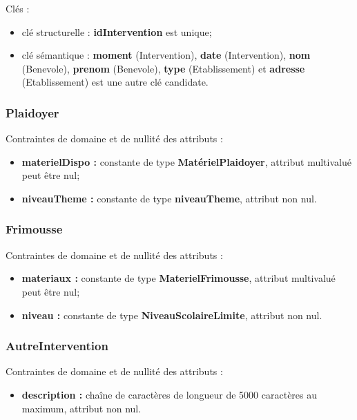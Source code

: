 Clés : 
\begin{itemize}
\item clé structurelle : \textbf{idIntervention} est unique;
\item clé sémantique : \textbf{moment} (Intervention), \textbf{date} (Intervention), \textbf{nom} (Benevole), \textbf{prenom} (Benevole), \textbf{type} (Etablissement) et \textbf{adresse} (Etablissement) est une autre clé candidate. \\ 
\end{itemize}

\subsubsection*{Plaidoyer}
Contraintes de domaine et de nullité des attributs :
\begin{itemize}
	\item \textbf{materielDispo :} constante de type \textbf{MatérielPlaidoyer}, attribut multivalué peut être nul; 
	\item \textbf{niveauTheme :} constante de type \textbf{niveauTheme}, attribut non nul.\\
\end{itemize}

\subsubsection*{Frimousse}
Contraintes de domaine et de nullité des attributs :
\begin{itemize}
	\item \textbf{materiaux :} constante de type \textbf{MaterielFrimousse}, attribut multivalué peut être nul;
	\item \textbf{niveau :} constante de type \textbf{NiveauScolaireLimite}, attribut non nul.\\
\end{itemize}

\subsubsection*{AutreIntervention}
Contraintes de domaine et de nullité des attributs :
\begin{itemize}
\item \textbf{description :} chaîne de caractères de longueur de 5000 caractères au maximum, attribut non nul.\\
\end{itemize}

